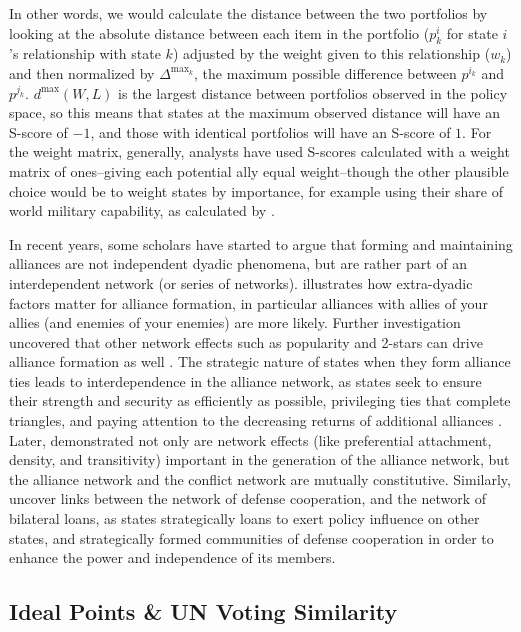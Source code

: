 \documentclass[12pt,pdflatex]{elsarticle}
\begin{document}
In other words, we would calculate the distance between the two portfolios by looking at the absolute distance between each item in the portfolio ($p^i_{k}$ for state $i$'s relationship with state $k$) adjusted by the weight given to this relationship ($w_{k}$) and then normalized by $\Delta^{\text{max}_{k}}$, the maximum possible difference between $p^{i_{k}}$ and $p^{j_{k}}$. $d^{\text{max}}(W,L)$ is the largest distance between portfolios observed in the policy space, so this means that states at the maximum observed distance will have an S-score of $-1$, and those with identical portfolios will have an S-score of $1$. For the weight matrix, generally, analysts have used S-scores calculated with a weight matrix of ones--giving each potential ally equal weight--though the other plausible choice would be to weight states by importance, for example using their share of world military capability, as calculated by \citet{singer:small:1995}.

In recent years, some scholars have started to argue that forming and maintaining alliances are not independent dyadic phenomena, but are rather part of an interdependent network (or series of networks). \citet{warren:2010} illustrates how extra-dyadic factors matter for alliance formation, in particular alliances with allies of your allies (and enemies of your enemies) are more likely. Further investigation uncovered that other network effects such as popularity and 2-stars can drive alliance formation as well \citep{cranmer:etal:2015}. The strategic nature of states when they form alliance ties leads to interdependence in the alliance network, as states seek to ensure their strength and security as efficiently as possible, privileging ties that complete triangles, and paying attention to the decreasing returns of additional alliances \citep{cranmer:etal:2012}. Later, \citet{warren:2016} demonstrated not only are network effects (like preferential attachment, density, and transitivity) important in the generation of the alliance network, but the alliance network and the conflict network are mutually constitutive. Similarly, \citet{kinne:bunte:2018} uncover links between the network of defense cooperation, and the network of bilateral loans, as states strategically loans to exert policy influence on other states, and strategically formed communities of defense cooperation in order to enhance the power and independence of its members.

\subsection*{Ideal Points \& UN Voting Similarity}
\end{document}
